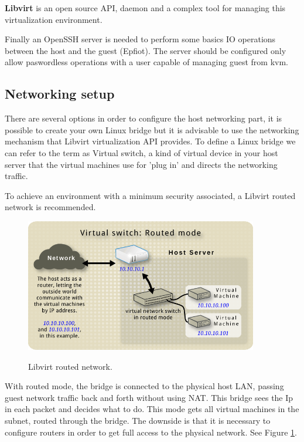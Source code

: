 \textbf{Libvirt} is an open source API, daemon and a complex tool for managing this virtualization environment. ~\cite{libvirt}

Finally an OpenSSH server is needed to perform some basics IO operations between the host and the guest (Epfiot). The server should be configured only allow paswordless operations with a user capable of managing guest from kvm.

\subsection{Networking setup}
\label{makereference3.1.3}

There are several options in order to configure the host networking part, it is possible to create your own Linux bridge but it is advisable to use the networking mechanism that Libvirt virtualization API provides.
To define a Linux bridge we can refer to the term as Virtual switch, a kind of virtual device in your host server that the virtual machines use for 'plug in' and directs the networking traffic.

To achieve an environment with a minimum security associated, a Libvirt routed network is recommended.


\begin{figure}[h!]%
\centering
    \includegraphics[width=4in]{figures/libvirt_routed_mode.png}
~\caption{Libvirt routed network. \cite{libvirt_networking}}
\label{figure3.1}
\end{figure}

With routed mode, the bridge is connected to the physical host LAN, passing guest network traffic back and forth without using NAT. This bridge sees the Ip in each packet and decides what to do. This mode gets all virtual machines in the subnet, routed through the bridge. The downside is that it is necessary to configure routers in order to get full access to the physical network. See Figure \ref{figure3.1}.

